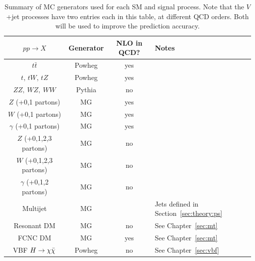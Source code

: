 \begin{table}[]
\begin{center}
    \caption{Summary of MC generators used for each SM and signal process.
             Note that the $V$+jet processes have two entries each in this table, at different QCD orders.
             Both will be used to improve the prediction accuracy.}
    \label{tab:theory:sim}
    \begin{tabular}{c|c|c|l}
        $pp\rightarrow X$ & Generator & NLO in QCD? & Notes \\ \hline \hline
        $t\bar{t}$ & Powheg & yes \\ 
        $t$, $tW$, $tZ$ & Powheg & yes \\ 
        \hline
        $ZZ,~WZ,~WW$ & Pythia &  no \\ 
        \hline
        $Z$ (+0,1 partons) & MG  & yes  \\ 
        $W$ (+0,1 partons) & MG  & yes \\ 
        $\gamma$ (+0,1 partons) & MG  & yes  \\ 
        \hline
        $Z$ (+0,1,2,3 partons) & MG  & no \\ 
        $W$ (+0,1,2,3 partons) & MG  & no  \\ 
        $\gamma$ (+0,1,2 partons) & MG  & no \\ 
        Multijet & MG && Jets defined in Section~\ref{sec:theory:ps} \\
        \hline
        Resonant DM & MG & no & See Chapter~\ref{sec:mt} \\ 
        FCNC DM & MG &yes& See Chapter~\ref{sec:mt} \\ 
        VBF $H\rightarrow\chi\bar\chi$ & Powheg &no & See Chapter~\ref{sec:vbf} \\ 
    \end{tabular}
\end{center}
\end{table}

